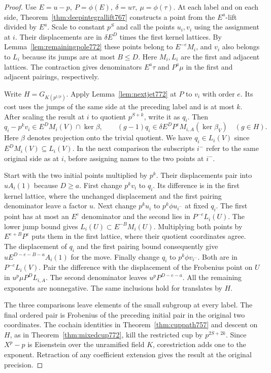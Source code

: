 \documentclass[a4paper,11pt]{article}
\theoremstyle{definition}
\theoremstyle{remark}
\numberwithin{equation}{section}
\begin{document}
\begin{proof}
Use \(E=u-p,\ P=\phi(E),\ \delta=u\tau,\ \mu=\phi(\tau)\).
At each label and on each side, Theorem~\ref{thm:deepintegrallift767}
constructs a point from the \(E^a\)-lift divided by \(E^a\).
Scale to constant \(p^S\) and call the points \(u_i,v_i\)
using the assignment at \(i\). Their displacements are in
\(\delta E^D\) times the first kernel lattices. By
Lemma~\ref{lem:remainingpole772} these points belong to
\(E^{-e}M_i\), and \(v_i\) also belongs to \(L_i\) because
its jumps are at most \(B\le D\). Here \(M_i,L_i\) are
the first and adjacent lattices. The contraction gives
denominators \(E^a\tau\) and \(P^a\mu\) in the first and
adjacent pairings, respectively.

Write \(H=G_{K(p^{1/p})}\). Apply Lemma~\ref{lem:nextjet772}
at \(P\) to \(v_i\) with order \(e\). Its cost uses the jumps
of the same side at the preceding label and is at most \(k\).
After scaling the result at \(i\) to quotient \(p^{S+k}\),
write it as \(q_i\). Then
\[
 q_i-p^k v_i\in E^D M_i(V)\cap\ker\beta,\qquad
 (g-1)q_i\in\delta E^D P^e M_{i,A}(\ker\beta_V)
                          \quad(g\in H).
\]
Here \(\beta\) denotes projection onto the trivial quotient.
We have \(q_i\in L_i(V)\) since \(E^D M_i(V)\subseteq L_i(V)\).
In the next comparison the subscripts \(i^-\) refer to the
same original side as at \(i\), before assigning names to
the two points at \(i^-\).

Start with the two initial points multiplied by \(p^k\).
Their displacements pair into \(uA_i(1)\) because \(D\ge a\).
First change \(p^k v_i\) to \(q_i\). Its difference is in
the first kernel lattice, where the unchanged displacement
and the first pairing denominator leave a factor \(u\).
Next change \(p^ku_i\) to \(p^k\phi u_{i^-}\) at fixed \(q_i\).
The first point has at most an \(E^e\) denominator and
the second lies in \(P^{-e}L_i(U)\). The lower jump bound
gives \(L_i(U)\subset E^{-B}M_i(U)\). Multiplying both
points by \(E^{e+B}P^e\) puts them in the first lattice,
where their quotient coordinates agree. The displacement
of \(q_i\) and the first pairing bound consequently give
\(u E^{D-e-B-a}A_i(1)\) for the move.
Finally change \(q_i\) to \(p^k\phi v_{i^-}\). Both are in
\(P^{-e}L_i(V)\). Pair the difference with the displacement
of the Frobenius point on \(U\) in \(u^p\mu P^D L_{i,A}\).
The second denominator leaves \(u^pP^{D-e-a}\).
All the remaining exponents are nonnegative. The same
inclusions hold for translates by \(H\).

The three comparisons leave elements of the small subgroup
at every label. The final ordered pair is Frobenius of the
preceding initial pair in the original two coordinates.
The cochain identities in Theorem~\ref{thm:cuppath757}
and descent on \(H\), as in Theorem~\ref{thm:mixedcup772},
kill the restricted cup by \(p^{2S+2k}\). Since
\(X^p-p\) is Eisenstein over the unramified field \(K\),
corestriction adds one to the exponent. Retraction of
any coefficient extension gives the result at the original
precision.
\end{proof}
\end{document}
